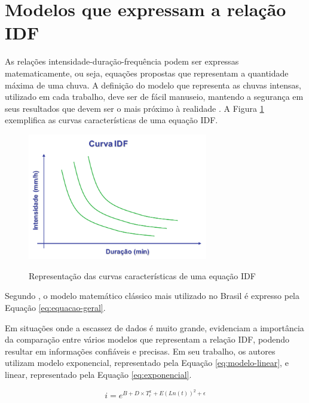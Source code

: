 \section{Modelos que expressam a relação IDF}

As relações intensidade-duração-frequência podem ser expressas matematicamente, ou seja, equações propostas que representam a quantidade máxima de uma chuva. A definição do modelo que representa as chuvas intensas, utilizado em cada trabalho, deve ser de fácil manuseio, mantendo a segurança em seus resultados que devem ser o mais próximo à realidade \cite{interpolacao-chuva}. A Figura \ref{fig:curva-idf} exemplifica as curvas características de uma equação IDF.

\begin{figure}[h]
    \caption{Representação das curvas características de uma equação IDF}
    \centering
    \includegraphics[width=0.7\textwidth]{Textuais/Figuras/curva-idf.pdf}
    \label{fig:curva-idf}
\end{figure}

Segundo , o modelo matemático clássico mais utilizado no Brasil é expresso pela Equação \ref{eq:equacao-geral}.

Em situações onde a escassez de dados é muito grande, evidenciam a importância da comparação entre vários modelos que representam a relação IDF, podendo resultar em informações confiáveis e precisas. Em seu trabalho, os autores  utilizam modelo exponencial, representado pela Equação \ref{eq:modelo-linear}, e linear, representado pela Equação \ref{eq:exponencial}.

\begin{equation}
\label{eq:modelo-linear}
    i = e^{B + D \times T_r^x + E (Ln(t))^2 + \epsilon}
\end{equation}

